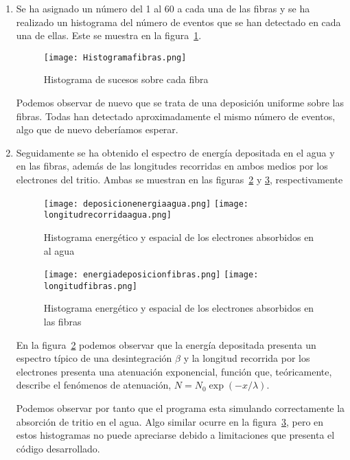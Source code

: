 \begin{enumerate}
\item{} Se ha asignado un número del 1 al 60 a cada una de las fibras y se ha realizado un histograma del número de eventos que se han detectado en cada una de ellas. Este se muestra en la figura~\ref{sucesossobrecadafibra}.

\begin{figure}[hbtp]
\centering
\texttt{[image: Histogramafibras.png]}
\caption{Histograma de sucesos sobre cada fibra\label{sucesossobrecadafibra}}
\end{figure}

Podemos observar de nuevo que se trata de una deposición uniforme sobre las fibras. Todas han detectado aproximadamente el mismo número de eventos, algo que de nuevo deberíamos esperar.

\item{} Seguidamente se ha obtenido el espectro de energía depositada en el agua y en las fibras, además de las longitudes recorridas en ambos medios por los electrones del tritio. Ambas se muestran en las figuras~\ref{deposicionagua} y \ref{deposicionfibras}, respectivamente

\begin{figure}[htb]
\centering
{
\texttt{[image: deposicionenergiaagua.png]} 
}
{
\texttt{[image: longitudrecorridaagua.png]} 
}
\caption{Histograma energético y espacial de los electrones absorbidos en al agua\label{deposicionagua}}
\end{figure}

\begin{figure}[htb]
\centering
{
\texttt{[image: energiadeposicionfibras.png]} 
}
{
\texttt{[image: longitudfibras.png]} 
}
\caption{Histograma energético y espacial de los electrones absorbidos en las fibras\label{deposicionfibras}}
\end{figure}

En la figura~\ref{deposicionagua} podemos observar que la energía depositada presenta un espectro típico de una desintegración $\beta$ y la longitud recorrida por los electrones presenta una atenuación exponencial, función que, teóricamente, describe el fenómenos de atenuación, $N=N_0\exp{(-x/\lambda)}$. 

Podemos observar por tanto que el programa esta simulando correctamente la absorción de tritio en el agua. Algo similar ocurre en la figura~\ref{deposicionfibras}, pero en estos histogramas no puede apreciarse debido a limitaciones que presenta el código desarrollado.


\end{enumerate}
